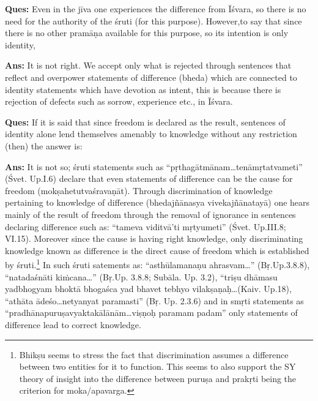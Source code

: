 \eject

\textbf{Ques:} Even in the jīva one experiences the difference from Īśvara, so there is no need for the authority of the śruti (for this purpose).  However,to say that  since there is no other pramāṇa available for this purpose, so its intention is only identity,

\textbf{Ans:} It is not right. We accept only what is rejected through sentences that reflect and overpower statements of difference (bheda) which are connected to identity statements which have devotion as intent, this is because there is rejection of defects such as sorrow, experience etc., in Īśvara.

\textbf{Ques:} If it is said that since freedom is declared as the result, sentences of identity alone lend themselves amenably to knowledge without any restriction (then) the answer is: 

\textbf{Ans:} It is not so; śruti statements such as “pṛthagātmānam…tenāmṛ\-tatvameti” (Śvet. Up.I.6) declare that even statements of difference can be the cause for freedom (mokṣahetutvaśravaṇāt). Through discrimination of knowledge pertaining to knowledge of difference (bhedajñānasya vivekajñānatayā) one hears mainly of the result of freedom through the removal of ignorance in sentences declaring difference such as: “tameva viditvā’ti mṛtyumeti” (Śvet. Up.III.8; VI.15). Moreover  since the cause  is having right knowledge, only discriminating knowledge known as difference is the direct cause of freedom which is established by śruti.\footnote{Bhikṣu seems to stress the fact that discrimination assumes a difference between two entities for it to function. This seems to also support the SY theory of insight into the difference between puruṣa and prakṛti being the criterion for moka/apavarga.} In such śruti satements as: “asthūlamanaṇu ahrasvam…” (Bṛ.Up.3.8.8), “natadaśnāti kiṁcana…” (Bṛ.Up. 3.8.8; Subāla. Up. 3.2), “triṣu dhāmasu yadbhogyam bhoktā bhogaśca yad bhavet tebhyo vilakṣaṇaḥ…(Kaiv. Up.18), “athāta ādeśo…netyanyat paramasti” (Bṛ. Up. 2.3.6) and in smṛti statements as “pradhānapuruṣavyaktakālānām…viṣṇoḥ paramam padam” only statements of difference lead to correct knowledge. 


